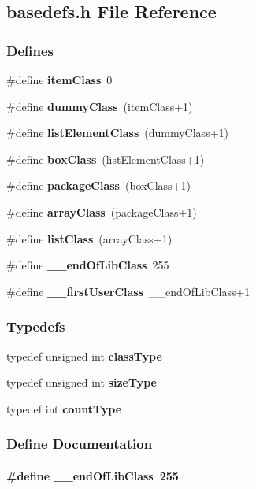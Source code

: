 \subsection{basedefs.h File Reference}
\label{basedefs.h}
\subsubsection*{Defines}
\begin{CompactItemize}
\item 
\#define {\bf item\-Class}\ 0
\item 
\#define {\bf dummy\-Class}\ (item\-Class+1)
\item 
\#define {\bf list\-Element\-Class}\ (dummy\-Class+1)
\item 
\#define {\bf box\-Class}\ (list\-Element\-Class+1)
\item 
\#define {\bf package\-Class}\ (box\-Class+1)
\item 
\#define {\bf array\-Class}\ (package\-Class+1)
\item 
\#define {\bf list\-Class}\ (array\-Class+1)
\item 
\#define {\bf \_\-\_\-end\-Of\-Lib\-Class}\ 255
\item 
\#define {\bf \_\-\_\-first\-User\-Class}\ \_\-\_\-end\-Of\-Lib\-Class+1
\end{CompactItemize}
\subsubsection*{Typedefs}
\begin{CompactItemize}
\item 
typedef unsigned int {\bf class\-Type}
\item 
typedef unsigned int {\bf size\-Type}
\item 
typedef int {\bf count\-Type}
\end{CompactItemize}


\subsubsection{Define Documentation}
\label{basedefs.h_a7}
\paragraph{\setlength{\rightskip}{0pt plus 5cm}\#define \_\-\_\-end\-Of\-Lib\-Class\ 255}\hfill



